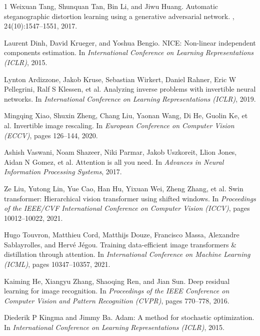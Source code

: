 \documentclass[10pt,twocolumn,letterpaper]{article}
\begin{document}
{\begin{thebibliography}{1}
    Weixuan Tang, Shunquan Tan, Bin Li, and Jiwu Huang.
    \newblock Automatic steganographic distortion learning using a generative adversarial network.
    , 24(10):1547--1551, 2017.

    Laurent Dinh, David Krueger, and Yoshua Bengio.
    \newblock NICE: Non-linear independent components estimation.
    \newblock In {\em International Conference on Learning Representations (ICLR)}, 2015.

    Lynton Ardizzone, Jakob Kruse, Sebastian Wirkert, Daniel Rahner, Eric W Pellegrini, Ralf S Klessen, et al.
    \newblock Analyzing inverse problems with invertible neural networks.
    \newblock In {\em International Conference on Learning Representations (ICLR)}, 2019.

    Mingqing Xiao, Shuxin Zheng, Chang Liu, Yaonan Wang, Di He, Guolin Ke, et al.
    \newblock Invertible image rescaling.
    \newblock In {\em European Conference on Computer Vision (ECCV)}, pages 126--144, 2020.

    Ashish Vaswani, Noam Shazeer, Niki Parmar, Jakob Uszkoreit, Llion Jones, Aidan N Gomez, et al.
    \newblock Attention is all you need.
    \newblock In {\em Advances in Neural Information Processing Systems}, 2017.

    Ze Liu, Yutong Lin, Yue Cao, Han Hu, Yixuan Wei, Zheng Zhang, et al.
    \newblock Swin transformer: Hierarchical vision transformer using shifted windows.
    \newblock In {\em Proceedings of the IEEE/CVF International Conference on Computer Vision (ICCV)}, pages 10012--10022, 2021.

    Hugo Touvron, Matthieu Cord, Matthijs Douze, Francisco Massa, Alexandre Sablayrolles, and Herv{\'e} J{\'e}gou.
    \newblock Training data-efficient image transformers \& distillation through attention.
    \newblock In {\em International Conference on Machine Learning (ICML)}, pages 10347--10357, 2021.

    Kaiming He, Xiangyu Zhang, Shaoqing Ren, and Jian Sun.
    \newblock Deep residual learning for image recognition.
    \newblock In {\em Proceedings of the IEEE Conference on Computer Vision and Pattern Recognition (CVPR)}, pages 770--778, 2016.

    Diederik P Kingma and Jimmy Ba.
    \newblock Adam: A method for stochastic optimization.
    \newblock In {\em International Conference on Learning Representations (ICLR)}, 2015.


\end{thebibliography}}
\end{document}
